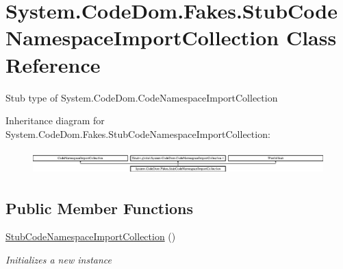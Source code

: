\hypertarget{class_system_1_1_code_dom_1_1_fakes_1_1_stub_code_namespace_import_collection}{\section{System.\-Code\-Dom.\-Fakes.\-Stub\-Code\-Namespace\-Import\-Collection Class Reference}
\label{class_system_1_1_code_dom_1_1_fakes_1_1_stub_code_namespace_import_collection}
}


Stub type of System.\-Code\-Dom.\-Code\-Namespace\-Import\-Collection 


Inheritance diagram for System.\-Code\-Dom.\-Fakes.\-Stub\-Code\-Namespace\-Import\-Collection\-:\begin{figure}[H]
\begin{center}
\leavevmode
\includegraphics[height=0.935673cm]{class_system_1_1_code_dom_1_1_fakes_1_1_stub_code_namespace_import_collection}
\end{center}
\end{figure}
\subsection*{Public Member Functions}
\begin{DoxyCompactItemize}
\item 
\hyperlink{class_system_1_1_code_dom_1_1_fakes_1_1_stub_code_namespace_import_collection_a7acd6290d3f7a431acd260530c2e939d}{Stub\-Code\-Namespace\-Import\-Collection} ()
\begin{DoxyCompactList}\small\item\em Initializes a new instance\end{DoxyCompactList}\end{DoxyCompactItemize}
